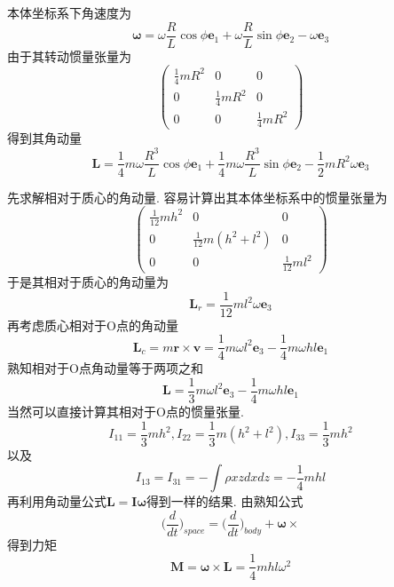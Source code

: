 \begin{solution}
    本体坐标系下角速度为
    $$\boldsymbol{\omega}=\omega\frac{R}{L}\cos\phi \textbf{e}_1+\omega\frac{R}{L}\sin\phi \textbf{e}_2-\omega \textbf{e}_3$$
    由于其转动惯量张量为
    $$\begin{pmatrix}
        \frac14mR^2&0&0\\0&\frac14mR^2&0\\0&0&\frac14mR^2
    \end{pmatrix}$$
    得到其角动量
    $$\textbf{L}=\frac14m\omega\frac{R^3}{L}\cos\phi \textbf{e}_1+\frac{1}{4}m\omega\frac{R^3}{L}\sin\phi \textbf{e}_2-\frac12mR^2\omega\textbf{e}_3$$
\end{solution}

\begin{solution}
    先求解相对于质心的角动量.
    容易计算出其本体坐标系中的惯量张量为
    $$\begin{pmatrix}
        \frac{1}{12}mh^2&0&0\\0&\frac{1}{12}m(h^2+l^2)&0\\0&0&\frac{1}{12}ml^2
    \end{pmatrix}$$
    于是其相对于质心的角动量为
    $$\textbf{L}_r=\frac{1}{12}ml^2\omega \textbf{e}_3$$
    再考虑质心相对于O点的角动量
    $$\textbf{L}_c=m\textbf{r}\times\textbf{v}=\frac14m\omega l^2\textbf{e}_3-\frac14m\omega hl\textbf{e}_1$$
    熟知相对于O点角动量等于两项之和
    $$\textbf{L}=\frac13m\omega l^2\textbf{e}_3-\frac14m\omega hl\textbf{e}_1$$
    当然可以直接计算其相对于O点的惯量张量.
    $$I_{11}=\frac13mh^2,I_{22}=\frac13m(h^2+l^2),I_33=\frac13mh^2$$
    以及
    $$I_{13}=I_{31}=-\int\rho xzdxdz=-\frac14mhl$$
    再利用角动量公式$\textbf{L}=\textbf{I}\boldsymbol{\omega}$得到一样的结果.
    由熟知公式
    $$\Big(\frac{d}{dt}\Big)_{space}=\Big(\frac{d}{dt}\Big)_{body}+\boldsymbol{\omega}\times$$
    得到力矩
    $$\textbf{M}=\boldsymbol{\omega}\times\textbf{L}=\frac14mhl\omega^2$$
\end{solution}

